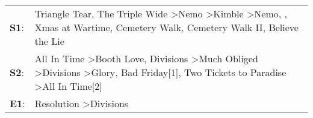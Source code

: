 \begin{supertabular}{p{0.03\textwidth}p{0.92\textwidth}}
 \textbf{S1}:  &  Triangle Tear\textsuperscript{}, \enspace The Triple Wide\textsuperscript{} \textgreater \enspace Nemo\textsuperscript{} \textgreater \enspace Kimble\textsuperscript{} \textgreater \enspace Nemo\textsuperscript{}, \textsuperscript{}, \enspace Xmas at Wartime\textsuperscript{}, \enspace Cemetery Walk\textsuperscript{}, \enspace Cemetery Walk II\textsuperscript{}, \enspace Believe the Lie\textsuperscript{}  \enspace  \\
 \textbf{S2}:  &      All In Time\textsuperscript{} \textgreater \enspace Booth Love\textsuperscript{}, \enspace Divisions\textsuperscript{} \textgreater \enspace Much Obliged\textsuperscript{} \textgreater \enspace Divisions\textsuperscript{} \textgreater \enspace Glory\textsuperscript{}, \enspace Bad Friday[1]\textsuperscript{}, \enspace Two Tickets to Paradise\textsuperscript{} \textgreater \enspace All In Time[2]\textsuperscript{}  \enspace  \\
 \textbf{E1}:  &                                                                                                                                                                                                                                                                                                                                                        Resolution\textsuperscript{} \textgreater \enspace Divisions\textsuperscript{}  \enspace  \\
\end{supertabular}
